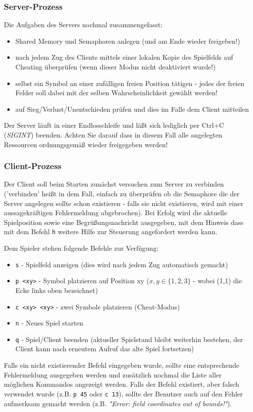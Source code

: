 \documentclass{article}
\begin{document}
\subsubsection*{Server-Prozess}
Die Aufgaben des Servers nochmal zusammengefasst:
\begin{itemize}
\item Shared Memory und Semaphoren anlegen (und am Ende wieder freigeben!)
\item nach jedem Zug des Clients mittels einer lokalen Kopie des Spielfelds auf Cheating überprüfen (wenn
  dieser Modus nicht deaktiviert wurde!)
\item selbst ein Symbol an einer zufälligen freien Position tätigen - jedes der freien Felder soll dabei
      mit der selben Wahrscheinlichkeit gewählt werden!
\item auf Sieg/Verlust/Unentschieden prüfen und dies im Falle dem Client mitteilen
\end{itemize}
Der Server läuft in einer Endlosschleife und läßt sich lediglich per
Ctrl+C (\textit{SIGINT}) beenden. Achten Sie darauf dass in diesem Fall
alle angelegten Ressourcen ordnungsgemäß wieder freigegeben werden!

\subsubsection*{Client-Prozess}
Der Client soll beim Starten zunächst versuchen zum Server zu verbinden
('verbinden' heißt in dem Fall, einfach zu überprüfen ob die Semaphore
die der Server angelegen sollte schon existieren - falls sie nicht existieren,
wird mit einer aussagekräftigen Fehlermeldung abgebrochen). Bei Erfolg wird die aktuelle
Spielposition sowie eine
Begrüßungsnachricht ausgegeben, mit dem Hinweis dass mit dem Befehl \texttt{h}
weitere Hilfe zur Steuerung angefordert werden kann.

Dem Spieler stehen folgende Befehle zur Verfügung:
\begin{itemize}
	\item \texttt{s} - Spielfeld anzeigen (dies wird nach jedem Zug automatisch gemacht)
	\item \texttt{p <xy>} - Symbol platzieren auf Position xy ($ x,y \in \{1,2,3\} $ - wobei (1,1) die Ecke links oben bezeichnet)
	\item \texttt{c <xy> <xy>} - zwei Symbole platzieren (Cheat-Modus)
	\item \texttt{n} - Neues Spiel starten
	\item \texttt{q} - Spiel/Client beenden (aktueller Spielstand bleibt weiterhin bestehen, der Client kann nach erneutem Aufruf das alte Spiel fortsetzen)
\end{itemize}
Falls ein nicht existierender Befehl eingegeben wurde, sollte eine entsprechende
Fehlermeldung ausgegeben werden und zusätzlich nochmal die Liste aller möglichen
Kommandos angezeigt werden. Falls der Befehl existiert, aber falsch verwendet wurde
(z.B. \texttt{p 45} oder \texttt{c 13}), sollte der Benutzer auch auf den Fehler
aufmerksam gemacht werden (z.B. \textit{"Error: field coordinates out of bounds!"}).
\end{document}

